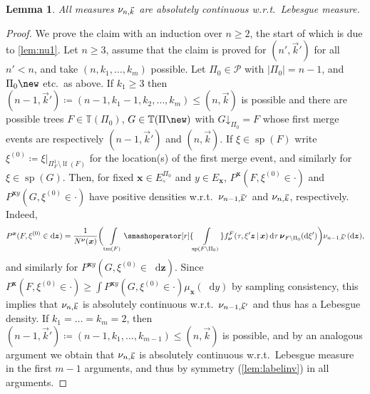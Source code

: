 \documentclass[reqno,draft]{amsart}
\numberwithin{equation}{section}
\theoremstyle{plain}
\newtheorem{lemma}[theorem]{Lemma}
\theoremstyle{remark}
\newcommand*\diff{\mathop{}\!\mathrm{d}}
\newcommand{\fpart}{\Pi} %
\DeclareMathOperator{\lf}{lf}
\DeclareMathOperator{\dct}{tm}
\DeclareMathOperator{\dcs}{sp}
\DeclareMathOperator{\dc}{Dec}
\newcommand{\fnu}{f_{\boldsymbol \nu}}
\newcommand{\nunk}{\nu_{n,\smash{\vec{k}}}}
\newcommand{\gnk}{\nu_{n,\smash{\vec{k}}}}
\newcommand{\rsto}[1]{\mathord\downarrow_{#1}}
\begin{document}
\begin{lemma}\label{lem:gnkdz}
    All measures $\nunk$ are absolutely continuous w.r.t.\ Lebesgue measure.
\end{lemma}
\begin{proof}
    We prove the claim with an induction over $n \ge 2$, the start of which is due to \cref{lem:nu1}. Let $n \ge 3$, assume that the claim is proved for $(n',\vec{k}')$ for all $n' < n$, and take $(n,k_1, \ldots ,k_m)$ possible. Let $\fpart_0\in \mathcal{P}$ with $|\fpart_0| = n -1$, and $\fpart_0\new$ etc.\ as above. If $k_1 \ge 3$ then $(n-1,\vec{k}') \coloneqq (n-1,k_1-1,k_2, \ldots ,k_m) \le (n,\vec{k})$ is possible and there are possible trees $F \in \mathbb{T}(\fpart_0)$, $G\in \mathbb{T}(\fpart\new)$ with $G\rsto{\fpart_0}=F$ whose first merge events are respectively $(n-1,\vec{k}')$ and $(n,\vec{k})$. If $\xi \in \dcs(F)$ write $\xi^{(0)} \coloneqq \xi\vert_{\fpart ^{1}_F \setminus \lf(F)}$ for the location(s) of the first merge event, and similarly for $\xi\in \dcs(G)$. Then, for fixed $\boldsymbol x\in E^{\fpart_0}_\circ $ and $y\in E_{\boldsymbol x}$, $P^{\boldsymbol x}(F,\xi^{(0)}\in \cdot )$ and $P^{\boldsymbol x y}(G,\xi^{(0)}\in \cdot )$ have positive densities w.r.t.\ $\nu_{n-1,\smash{\vec{k}'}}$ and $\nunk$, respectively. Indeed,
    \begin{align*}
        P^{\boldsymbol x}(F,\xi^{(0)}\in \diff \boldsymbol z) = \frac{1}{N^{\boldsymbol\nu}(\boldsymbol x)} \bigg(\int\limits_{\dct(F)} \smashoperator[r]{\int\limits_{\dcs(F\setminus \fpart_0)}} \fnu^F(\tau,\xi' \boldsymbol z \,\vert\,\boldsymbol x) \diff \tau\,\boldsymbol \nu_{F\setminus \fpart_0}(\diff \xi')\bigg) \nu_{n-1,\smash{\vec{k}'}}(\diff \boldsymbol z),
    \end{align*}
    and similarly for $P^{\boldsymbol xy}(G,\xi^{(0)}\in \diff\boldsymbol z)$. Since $P^{\boldsymbol x}(F,\xi^{(0)} \in \cdot ) \ge \int P^{\boldsymbol x y}(G,\xi^{(0)}\in \cdot  ) \mu_{\boldsymbol x}(\diff y)$ by sampling consistency, this implies that $\nunk$ is absolutely continuous w.r.t.\ $\nu_{n-1,\smash{\vec{k}'}}$ and thus has a Lebesgue density. If $k_1 = \ldots = k_m = 2$, then $(n-1,\vec{k}') \coloneqq (n-1,k_1, \ldots ,k_{m-1}) \le (n,\vec{k})$ is possible, and by an analogous argument we obtain that $\nunk$ is absolutely continuous w.r.t.\ Lebesgue measure in the first $m-1$ arguments, and thus by symmetry (\cref{lem:labelinv}) in all arguments.
\end{proof}
\end{document}
